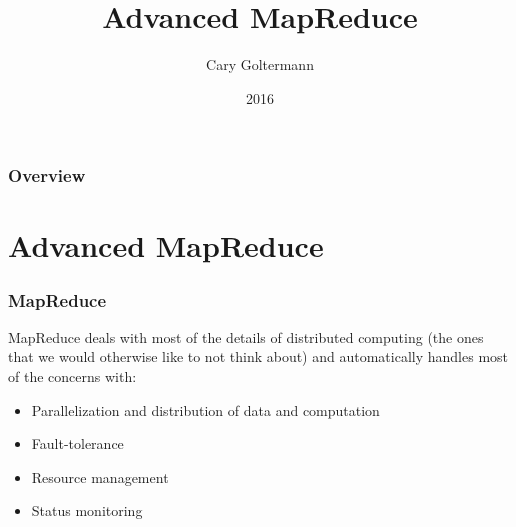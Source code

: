 \documentclass{beamer}
\title{Advanced MapReduce}
\author{Cary Goltermann}
\institute{Galvanize}
\date{2016}
\begin{document}
 
\frame{\titlepage}

\begin{frame}
  \frametitle{Overview}
  \tableofcontents[]
\end{frame}

\section{Advanced MapReduce}
\begin{frame}
  \frametitle{MapReduce}
  \parbox{\linewidth}{MapReduce deals with most of the details of distributed computing (the ones that we would otherwise like to not think about) and automatically handles most of the concerns with:}
  \vspace{4mm}
  \begin{itemize}
    \item Parallelization and distribution of data and computation
    \item Fault-tolerance
    \item Resource management
    \item Status monitoring
  \end{itemize}
\end{frame}
\end{document}
